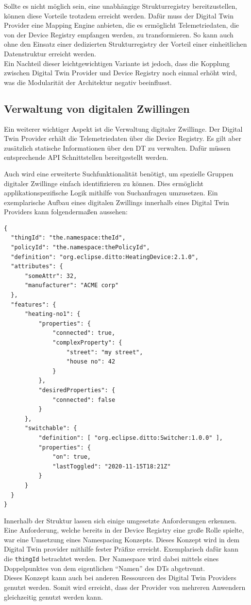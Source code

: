 Sollte es nicht möglich sein, eine unabhängige Strukturregistry bereitzustellen, können diese Vorteile trotzdem erreicht werden. Dafür muss der Digital Twin Provider eine Mapping Engine anbieten, die es ermöglicht Telemetriedaten, die von der Device Registry empfangen werden, zu transformieren. So kann auch ohne den Einsatz einer dedizierten Strukturregistry der Vorteil einer einheitlichen Datenstruktur erreicht werden.\\
Ein Nachteil dieser leichtgewichtigen Variante ist jedoch, dass die Kopplung zwischen Digital Twin Provider und Device Registry noch einmal erhöht wird, was die Modularität der Architektur negativ beeinflusst.

\subsection{Verwaltung von digitalen Zwillingen}

Ein weiterer wichtiger Aspekt ist die Verwaltung digitaler Zwillinge. Der Digital Twin Provider erhält die Telemetriedaten über die Device Registry. Es gilt aber zusätzlich statische Informationen über den \ac{DT} zu verwalten. Dafür müssen entsprechende API Schnittstellen bereitgestellt werden.

Auch wird eine erweiterte Suchfunktionalität benötigt, um spezielle Gruppen digitaler Zwillinge einfach identifizieren zu können. Dies ermöglicht applikationspezifische Logik mithilfe von Suchanfragen umzusetzen. Ein exemplarische Aufbau eines digitalen Zwillings innerhalb eines Digital Twin Providers kann folgendermaßen aussehen:

\begin{verbatim}
{
  "thingId": "the.namespace:theId",
  "policyId": "the.namespace:thePolicyId",
  "definition": "org.eclipse.ditto:HeatingDevice:2.1.0",
  "attributes": {
      "someAttr": 32,
      "manufacturer": "ACME corp"
  },
  "features": {
      "heating-no1": {
          "properties": {
              "connected": true,
              "complexProperty": {
                  "street": "my street",
                  "house no": 42
              }
          },
          "desiredProperties": {
              "connected": false
          }
      },
      "switchable": {
          "definition": [ "org.eclipse.ditto:Switcher:1.0.0" ],
          "properties": {
              "on": true,
              "lastToggled": "2020-11-15T18:21Z"
          }
      }
  }
}
\end{verbatim}

Innerhalb der Struktur lassen sich einige umgesetzte Anforderungen erkennen. Eine Anforderung, welche bereits in der Device Registry eine große Rolle spielte, war eine Umsetzung eines Namespacing Konzepts. Dieses Konzept wird in dem Digital Twin provider mithilfe fester Präfixe erreicht. Exemplarisch dafür kann die \texttt{thingId} betrachtet werden. Der Namespace wird dabei mittels eines Doppelpunktes von dem eigentlichen \enquote{Namen} des \ac{DT}s abgetrennt. \\
Dieses Konzept kann auch bei anderen Ressourcen des Digital Twin Providers genutzt werden. Somit wird erreicht, dass der Provider von mehreren Anwendern gleichzeitig genutzt werden kann.

